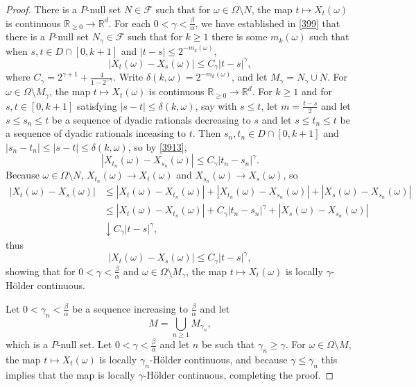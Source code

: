 \documentclass{article}
\theoremstyle{definition}
\begin{document}
\begin{proof}
There is a $P$-null set $N \in \mathscr{F}$ such that for $\omega \in \Omega \setminus N$, the map
$t \mapsto X_t(\omega)$ is continuous $\mathbb{R}_{\geq 0} \to \mathbb{R}^d$. 
For each $0<\gamma<\frac{\beta}{\alpha}$, we have established in \eqref{399} that there is a $P$-null set
$N_\gamma \in \mathscr{F}$ such that for $k \geq 1$ 
there is some $m_k(\omega)$ such that when 
 $s,t \in D \cap [0,k+1]$ and $|t-s| \leq 2^{-m_k(\omega)}$,
 \begin{equation}
 |X_t(\omega)-X_s(\omega)| \leq C_\gamma |t-s|^\gamma,
 \label{3913}
 \end{equation}
 where $C_\gamma = 2^{\gamma+1}+\frac{4}{1-2^{-\gamma}}$. 
 Write  $\delta(k,\omega) = 2^{-m_k(\omega)}$, and
 let $M_\gamma = N_\gamma \cup N$.
 For $\omega \in \Omega \setminus M_\gamma$, the map $t \mapsto 
 X_t(\omega)$ is continuous $\mathbb{R}_{\geq 0} \to \mathbb{R}^d$. 
 For $k \geq 1$ and for $s,t \in [0,k+1]$ satisfying $|s-t| \leq \delta(k,\omega)$, say with $s \leq t$,
let $m=\frac{t-s}{2}$ and let
$s\leq s_n \leq t$ be a sequence of dyadic rationals decreasing to $s$ and let
$s \leq t_n \leq t$ be a sequence of dyadic rationals inceasing to $t$. 
Then $s_n,t_n \in D \cap [0,k+1]$
and $|s_n-t_n| \leq |s-t| \leq \delta(k,\omega)$,  
 so  by \eqref{3913}, 
 \[
 |X_{t_n}(\omega)-X_{s_n}(\omega)| \leq C_\gamma |t_n-s_n|^\gamma.
 \]
Because $\omega \in \Omega \setminus N$, $X_{t_n}(\omega) \to X_t(\omega)$ and
$X_{s_n}(\omega) \to X_s(\omega)$, so
\begin{align*}
|X_t(\omega)-X_s(\omega)|& \leq |X_t(\omega)-X_{t_n}(\omega)|
+|X_{t_n}(\omega)-X_{s_n}(\omega)|+|X_s(\omega)-X_{s_n}(\omega)|\\
&\leq |X_t(\omega)-X_{t_n}(\omega)|+C_\gamma |t_n-s_n|^\gamma+|X_s(\omega)-X_{s_n}(\omega)|\\
&\downarrow C_\gamma |t-s|^\gamma,
\end{align*}
thus
\[
|X_t(\omega)-X_s(\omega)| \leq C_\gamma |t-s|^\gamma,
\]
showing that for  $0<\gamma<\frac{\beta}{\alpha}$ and 
$\omega \in \Omega \setminus M_\gamma$, the map $t \mapsto X_t(\omega)$ is locally
$\gamma$-H\"older continuous. 

Let $0<\gamma_n<\frac{\beta}{\alpha}$ be a sequence increasing to $\frac{\beta}{\alpha}$ and let 
\[
M = \bigcup_{n \geq 1} M_{\gamma_n},
\]
which is a $P$-null set. 
Let $0<\gamma<\frac{\beta}{\alpha}$ and let $n$ be such that $\gamma_n \geq \gamma$.
For $\omega \in \Omega \setminus M$, the map
$t \mapsto X_t(\omega)$ is locally $\gamma_n$-H\"older continuous, and because
$\gamma \leq \gamma_n$ this implies that the map is locally $\gamma$-H\"older continuous, completing the proof.
\end{proof}
\end{document}
